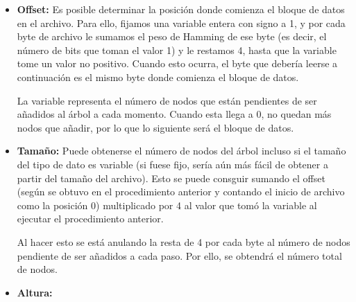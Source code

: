 \documentclass{article}
\begin{document}
\begin{itemize}
	\item \textbf{Offset:} Es posible determinar la posición donde comienza el
	bloque de datos en el archivo. Para ello, fijamos una variable entera con
	signo a 1, y por cada byte de archivo le sumamos el peso de Hamming de ese
	byte (es decir, el número de bits que toman el valor 1) y le restamos 4, hasta
	que la variable tome un valor no positivo. Cuando esto ocurra, el byte que
	debería leerse a continuación es el mismo byte donde comienza el bloque de
	datos.

	La variable representa el número de nodos que están pendientes de ser añadidos
	al árbol a cada momento. Cuando esta llega a 0, no quedan más nodos que añadir,
	por lo que lo siguiente será el bloque de datos.
	\item \textbf{Tamaño:} Puede obtenerse el número de nodos del árbol incluso
	si el tamaño del tipo de dato es variable (si fuese fijo, sería aún más fácil
	de obtener a partir del tamaño del archivo). Esto se puede consguir sumando el
	offset (según se obtuvo en el procedimiento anterior y contando el inicio de
	archivo como la posición 0) multiplicado por 4 al valor que tomó la variable al
	ejecutar el procedimiento anterior.

	Al hacer esto se está anulando la resta de 4 por cada byte al número de nodos
	pendiente de ser añadidos a cada paso. Por ello, se obtendrá el número total
	de nodos.
	\item \textbf{Altura:} %
\end{itemize}
\end{document}
